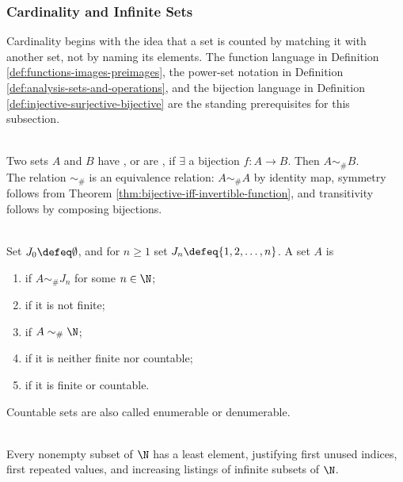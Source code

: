 \subsubsection{Cardinality and Infinite Sets}


Cardinality begins with the idea that a set is counted by matching it with another set, not by naming its elements. The function language in Definition \ref{def:functions-images-preimages}, the power-set notation in Definition \ref{def:analysis-sets-and-operations}, and the bijection language in Definition \ref{def:injective-surjective-bijective} are the standing prerequisites for this subsection.

\begin{definition} \label{def:cardinality-equivalence} \\
Two sets $A$ and $B$ have , or are , if $\exists$ a bijection $f:A\to B$. Then $A\sim_{\#}B$.\\
The relation $\sim_{\#}$ is an equivalence relation: $A\sim_{\#}A$ by identity map, symmetry follows from Theorem \ref{thm:bijective-iff-invertible-function}, and transitivity follows by composing bijections.
\end{definition}

\begin{definition} \label{def:finite-countable-uncountable}\label{def:cardinality-core-definitions-source-todo} \\
Set $J_0\defeq\emptyset$, and for $n\geq1$ set $J_n\defeq\{1,2,\ldots,n\}$. A set $A$ is
\begin{enumerate}[label=(\roman*)]
\setlength{\itemsep}{0pt}
\item {} if $A\sim_{\#} J_n$ for some $n\in\N$;
\item {} if it is not finite;
\item {} if $A\sim_{\#} \N$;
\item {} if it is neither finite nor countable;
\item {} if it is finite or countable.
\end{enumerate}
Countable sets are also called enumerable or denumerable.
\end{definition}

\begin{principle} \label{princ:well-ordering-natural-numbers} \\
Every nonempty subset of $\N$ has a least element, justifying first unused indices, first repeated values, and increasing listings of infinite subsets of $\N$.
\end{principle}


